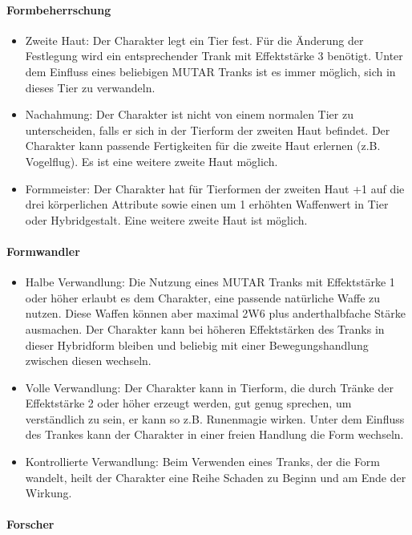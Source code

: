 \documentclass{article}
\begin{document}
\paragraph{Formbeherrschung}

\begin{itemize}
\item Zweite Haut: Der Charakter legt ein Tier fest. Für die Änderung der Festlegung wird ein entsprechender Trank mit Effektstärke 3 benötigt. Unter dem Einfluss eines beliebigen MUTAR Tranks ist es immer möglich, sich in dieses Tier zu verwandeln.
\item Nachahmung: Der Charakter ist nicht von einem normalen Tier zu unterscheiden, falls er sich in der Tierform der zweiten Haut befindet. Der Charakter kann passende Fertigkeiten für die zweite Haut erlernen (z.B. Vogelflug). Es ist eine weitere zweite Haut möglich.
\item Formmeister: Der Charakter hat für Tierformen der zweiten Haut +1 auf die drei körperlichen Attribute sowie einen um 1 erhöhten Waffenwert in Tier oder Hybridgestalt. Eine weitere zweite Haut ist möglich.
\end{itemize}

\paragraph{Formwandler}

\begin{itemize}
\item Halbe Verwandlung: Die Nutzung eines MUTAR Tranks mit Effektstärke 1 oder höher erlaubt es dem Charakter, eine passende natürliche Waffe zu nutzen. Diese Waffen können aber maximal 2W6 plus anderthalbfache Stärke ausmachen. Der Charakter kann bei höheren Effektstärken des Tranks in dieser Hybridform bleiben und beliebig mit einer Bewegungshandlung zwischen diesen wechseln.
\item Volle Verwandlung: Der Charakter kann in Tierform, die durch Tränke der Effektstärke 2 oder höher erzeugt werden, gut genug sprechen, um verständlich zu sein, er kann so z.B. Runenmagie wirken. Unter dem Einfluss des Trankes kann der Charakter in einer freien Handlung die Form wechseln.
\item Kontrollierte Verwandlung: Beim Verwenden eines Tranks, der die Form wandelt, heilt der Charakter eine Reihe Schaden zu Beginn und am Ende der Wirkung.
\end{itemize}

\paragraph{Forscher}
\end{document}
